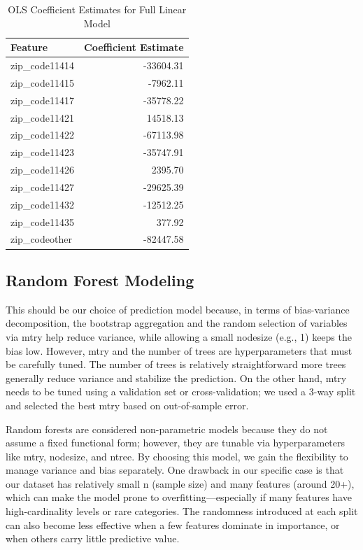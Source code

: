 \documentclass[12pt]{article}
\begin{document}
\begin{table}[H]
\centering
\renewcommand{\arraystretch}{1.2}
\begin{tabular}{|l|r|}
\hline
\textbf{Feature} & \textbf{Coefficient Estimate} \\
\hline
zip\_code11414 & -33604.31 \\
zip\_code11415 & -7962.11 \\
zip\_code11417 & -35778.22 \\
zip\_code11421 & 14518.13 \\
zip\_code11422 & -67113.98 \\
zip\_code11423 & -35747.91 \\
zip\_code11426 & 2395.70 \\
zip\_code11427 & -29625.39 \\
zip\_code11432 & -12512.25 \\
zip\_code11435 & 377.92 \\
zip\_codeother & -82447.58 \\
\hline
\end{tabular}
\caption{OLS Coefficient Estimates for Full Linear Model}
\label{tab:ols_full_coeff}
\end{table}

\subsection{Random Forest Modeling}

This should be our choice of prediction model because, in terms of bias-variance decomposition, the bootstrap aggregation and the random selection of variables via mtry help reduce variance, while allowing a small nodesize (e.g., 1) keeps the bias low. However, mtry and the number of trees are hyperparameters that must be carefully tuned. The number of trees is relatively straightforward more trees generally reduce variance and stabilize the prediction. On the other hand, mtry needs to be tuned using a validation set or cross-validation; we used a 3-way split and selected the best mtry based on out-of-sample error.

Random forests are considered non-parametric models because they do not assume a fixed functional form; however, they are tunable via hyperparameters like mtry, nodesize, and ntree. By choosing this model, we gain the flexibility to manage variance and bias separately. One drawback in our specific case is that our dataset has relatively small n (sample size) and many features (around 20+), which can make the model prone to overfitting—especially if many features have high-cardinality levels or rare categories. The randomness introduced at each split can also become less effective when a few features dominate in importance, or when others carry little predictive value.
\end{document}
